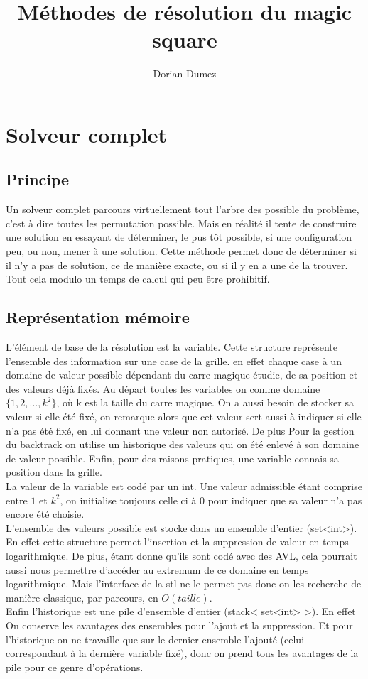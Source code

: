 \documentclass[12pt,a4paper]{article}
\title{Méthodes de résolution du magic square}
\author{Dorian Dumez}
\begin{document}
\maketitle
\section{Solveur complet}

\subsection{Principe}

Un solveur complet parcours virtuellement tout l'arbre des possible du problème, c'est à dire toutes les permutation possible. Mais en réalité il tente de construire une solution en essayant de déterminer, le pus tôt possible, si une configuration peu, ou non, mener à une solution. Cette méthode permet donc de déterminer si il n'y a pas de solution, ce de manière exacte, ou si il y en a une de la trouver. Tout cela modulo un temps de calcul qui peu être prohibitif.

\subsection{Représentation mémoire}

L’élément de base de la résolution est la variable. Cette structure représente l'ensemble des information sur une case de la grille. en effet chaque case à un domaine de valeur possible dépendant du carre magique étudie, de sa position et des valeurs déjà fixés. Au départ toutes les variables on comme domaine $\{ 1,2,..., k^2 \}$, où k est la taille du carre magique. On a aussi besoin de stocker sa valeur si elle été fixé, on remarque alors que cet valeur sert aussi à indiquer si elle n'a pas été fixé, en lui donnant une valeur non autorisé. De plus Pour la gestion du backtrack on utilise un historique des valeurs qui on été enlevé à son domaine de valeur possible. Enfin, pour des raisons pratiques, une variable connais sa position dans la grille.\\

La valeur de la variable est codé par un int. Une valeur admissible étant comprise entre $1$ et $k^2$, on initialise toujours celle ci à 0 pour indiquer que sa valeur n'a pas encore été choisie.\\
L’ensemble des valeurs possible est stocke dans un ensemble d'entier (set\textless int\textgreater). En effet cette structure permet l'insertion et la suppression de valeur en temps logarithmique. De plus, étant donne qu'ils sont codé avec des AVL, cela pourrait aussi nous permettre d’accéder au extremum de ce domaine en temps logarithmique. Mais l'interface de la stl ne le permet pas donc on les recherche de manière classique, par parcours, en $O(taille)$.\\
Enfin l'historique est une pile d'ensemble d'entier (stack< set<int> >). En effet On conserve les avantages des ensembles pour l'ajout et la suppression. Et pour l'historique on ne travaille que sur le dernier ensemble l'ajouté (celui correspondant à la dernière variable fixé), donc on prend tous les avantages de la pile pour ce genre d’opérations.\\
\end{document}
